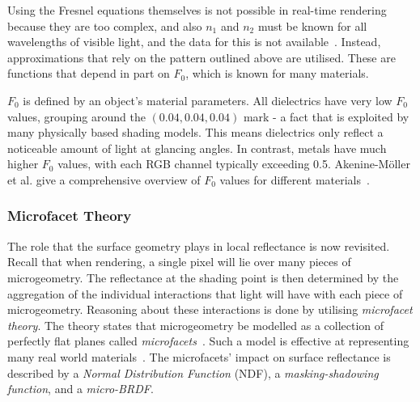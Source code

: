 Using the Fresnel equations themselves is not possible in real-time rendering because they are too complex, and also \begin{math}n_1\end{math} and \begin{math}n_2\end{math} must be known for all wavelengths of visible light, and the data for this is not available~\cite{SchlickApproximation}. Instead, approximations that rely on the pattern outlined above are utilised. These are functions that depend in part on \begin{math}F_0\end{math}, which is known for many materials.

\begin{math}F_0\end{math} is defined by an object's material parameters. All dielectrics have very low \begin{math}F_0\end{math} values, grouping around the \begin{math}(0.04, 0.04, 0.04)\end{math} mark - a fact that is exploited by many physically based shading models. This means dielectrics only reflect a noticeable amount of light at glancing angles. In contrast, metals have much higher \begin{math}F_0\end{math} values, with each RGB channel typically exceeding 0.5. Akenine-M\"{o}ller et al. give a comprehensive overview of \begin{math}F_0\end{math} values for different materials~\cite{RTR4}.

\subsubsection{Microfacet Theory} \label{MicrofacetTheory}

The role that the surface geometry plays in local reflectance is now revisited. Recall that when rendering, a single pixel will lie over many pieces of microgeometry. The reflectance at the shading point is then determined by the aggregation of the individual interactions that light will have with each piece of microgeometry. Reasoning about these interactions is done by utilising \textit{microfacet theory}. The theory states that microgeometry be modelled as a collection of perfectly flat planes called \textit{microfacets}~\cite{BlinnModelsOfLightReflection}. Such a model is effective at representing many real world materials~\cite{ExperimentalAnalysisOfBRDF}. The microfacets' impact on surface reflectance is described by a \textit{Normal Distribution Function} (NDF), a \textit{masking-shadowing function}, and a \textit{micro-BRDF}.

